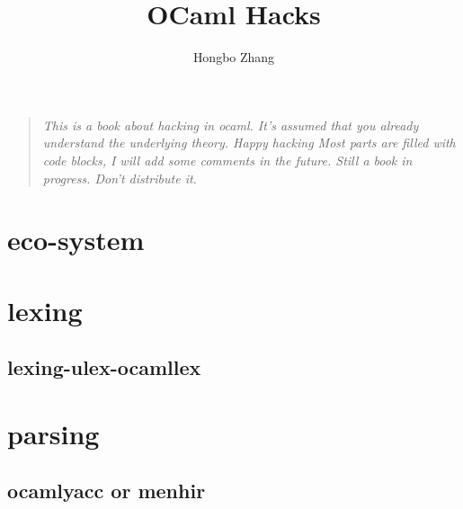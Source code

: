 \documentclass[svgnames,12pt,a4paper]{report}
\begin{document}
\setcounter{tocdepth}{4}
\title{OCaml Hacks}
\author{Hongbo Zhang}

\maketitle
{}
\begin{quotation}
  \textit{
This is a book about hacking in ocaml.
It's assumed that you already understand the underlying theory. Happy hacking
Most parts are filled with code blocks, I will add some comments in the future. Still a book in progress. Don't distribute it.}

\smiley
\end{quotation}



\newpage

\tableofcontents
\listoftodos
\vspace*{1cm}

\newpage



\newpage 
\chapter{eco-system}












\chapter{lexing}
\section{lexing-ulex-ocamllex}
\label{sec:parsing-lexing-1}



\chapter{parsing}
\section{ocamlyacc or menhir}
\label{sec:ocamlyacc}

\end{document}
